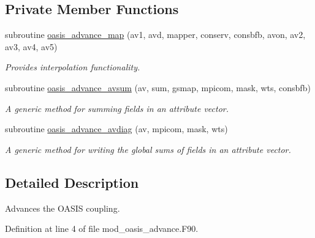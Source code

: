 \subsection*{Private Member Functions}
\begin{DoxyCompactItemize}
\item 
subroutine \hyperlink{classmod__oasis__advance_a4692a2d1d0024523b61675947d4f3a4d}{oasis\+\_\+advance\+\_\+map} (av1, avd, mapper, conserv, consbfb, avon, av2, av3, av4, av5)
\begin{DoxyCompactList}\small\item\em Provides interpolation functionality. \end{DoxyCompactList}\item 
subroutine \hyperlink{classmod__oasis__advance_a936f1af2fa561d57672d5c09a528cf46}{oasis\+\_\+advance\+\_\+avsum} (av, sum, gsmap, mpicom, mask, wts, consbfb)
\begin{DoxyCompactList}\small\item\em A generic method for summing fields in an attribute vector. \end{DoxyCompactList}\item 
subroutine \hyperlink{classmod__oasis__advance_af611b26fe4601ded488fd5d3c03b12a2}{oasis\+\_\+advance\+\_\+avdiag} (av, mpicom, mask, wts)
\begin{DoxyCompactList}\small\item\em A generic method for writing the global sums of fields in an attribute vector. \end{DoxyCompactList}\end{DoxyCompactItemize}


\subsection{Detailed Description}
Advances the O\+A\+S\+I\+S coupling. 

Definition at line 4 of file mod\+\_\+oasis\+\_\+advance.\+F90.



